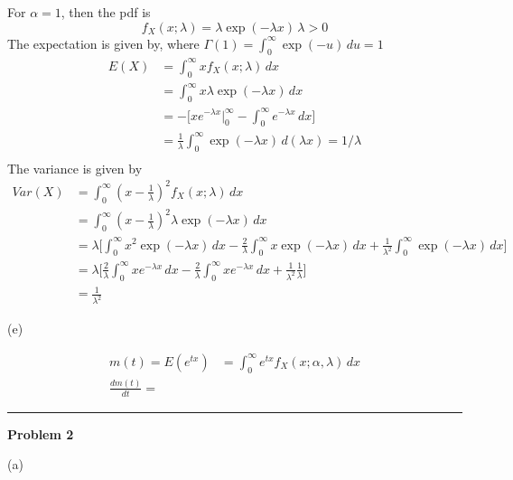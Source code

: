 \documentclass[letterpaper, 11pt]{article}
\newcommand{\1}{\mathds{1}}	%
\theoremstyle{definition}
\begin{document}
For $\alpha = 1$, then the pdf is \[
    f_X(x;\lambda) = \lambda\exp(-\lambda x) \, \lambda > 0
\]
The expectation is given by, where $\Gamma(1) = \int_{0}^{\infty } \exp(-u) \, du = 1 $ \begin{align*}
    E(X) & = \int_{0}^{\infty } xf_X(x;\lambda) \, dx                                                \\
         & = \int_{0}^{\infty } x\lambda\exp(-\lambda x) \, dx                                       \\
         & = - \Big[ xe^{-\lambda x} \Big|_0^\infty  - \int_{0}^{\infty } e^{-\lambda x} \, dx \Big] \\
         & = \frac{1}{\lambda} \int_{0}^{\infty } \exp(-\lambda x) \, d(\lambda x) = 1/\lambda       \\
\end{align*}
The variance is given by \begin{align*}
    Var(X) & = \int_{0}^{\infty } (x- \frac{1}{\lambda})^{2}f_X(x ; \lambda) \, dx                                                                                                                              \\
           & = \int_{0}^{\infty } (x- \frac{1}{\lambda})^{2} \lambda\exp(-\lambda x) \, dx                                                                                                                      \\
           & = \lambda\Big[\int_{0}^{\infty } x^2 \exp(-\lambda x) \, dx -\frac{2}{\lambda}\int_{0}^{\infty } x \exp(-\lambda x) \, dx + \frac{1}{\lambda ^{2}} \int_{0}^{\infty } \exp(-\lambda x) \, dx \Big] \\
           & = \lambda \Big[ \frac{2}{\lambda} \int_{0}^{\infty } x e^{-\lambda x} \, dx  - \frac{2}{\lambda} \int_{0}^{\infty } x e^{-\lambda x} \, dx + \frac{1}{\lambda ^{2}} \frac{1}{\lambda} \Big]        \\
           & = \frac{1}{\lambda ^{2}}
\end{align*}

(e)

\begin{align*}
    m(t) = E(e^{tx}) & = \int_{0}^{\infty } e^{tx} f_X(x;\alpha,\lambda) \, dx \\
    \frac{d m(t)}{dt} =
\end{align*}

\bigskip
\hrule
\bigskip


\textbf{Problem 2}

(a)
\end{document}
